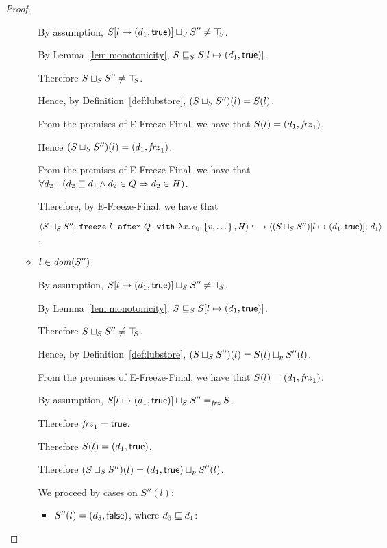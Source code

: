 \begin{proof}
\begin{itemize}
\begin{itemize}
        By assumption, $S[l \mapsto (d_1, \textsf{true})] \sqcup_{S} S''
        \neq \top\hspace{-0.85mm}_{S}$.

        By Lemma~\ref{lem:monotonicity},
        $S \sqsubseteq_S S[l \mapsto (d_1, \textsf{true})]$.

        Therefore $S \sqcup_{S} S'' \neq \top\hspace{-0.85mm}_{S}$.

        Hence, by Definition~\ref{def:lubstore},
        $(S \sqcup_{S} S'')(l) = S(l)$.

        From the premises of {\sc E-Freeze-Final}, we have that $S(l)
        = (d_1, \mathit{frz}_1)$.

        Hence $(S \sqcup_{S} S'')(l) = (d_1, \mathit{frz}_1)$.

        From the premises of {\sc E-Freeze-Final}, we have that
        $\forall{d_2} ~.~ ( {d_2 \sqsubseteq d_1 \land d_2 \in Q} \Rightarrow d_2 \in
        H)$.

        Therefore, by {\sc E-Freeze-Final}, we have that

        $\config{\lubstore{S}{S''}}{\freezeafterfull{l}{Q}{\lam{x}{e_0}}{\setof{v,
              \dots}}{H}} \parstepsto
        \config{\extS{(\lubstore{S}{S''})}{l}{d_1}{\frozentrue}}{d_1}$.


      \item $l \in \mathit{dom}(S'')$:

        By assumption, $S[l \mapsto (d_1, \textsf{true})] \sqcup_{S} S''
        \neq \top\hspace{-0.85mm}_{S}$.

        By Lemma~\ref{lem:monotonicity},
        $S \sqsubseteq_S S[l \mapsto (d_1, \textsf{true})]$.

        Therefore $S \sqcup_{S} S'' \neq \top\hspace{-0.85mm}_{S}$.

        Hence, by Definition~\ref{def:lubstore},
        $(S \sqcup_{S} S'')(l) = S(l) \sqcup_p S''(l)$.

        From the premises of {\sc E-Freeze-Final}, we have that
        $S(l) = (d_1, \mathit{frz}_1)$.

        By assumption, $S[l \mapsto (d_1, \textsf{true})] \sqcup_{S} S''
        =_{\textit{frz}} S$.

        Therefore $\mathit{frz}_1 = \textsf{true}$.

        Therefore $S(l) = (d_1, \textsf{true})$.

        Therefore $(S \sqcup_{S} S'')(l) =
        (d_1, \textsf{true}) \sqcup_p S''(l)$.

        We proceed by cases on $S''(l)$:
        \begin{itemize}
        \item $S''(l) = (d_3, \textsf{false})$, where $d_3 \sqsubseteq d_1$:


\end{itemize}
\end{itemize}
\end{itemize}
\end{proof}
